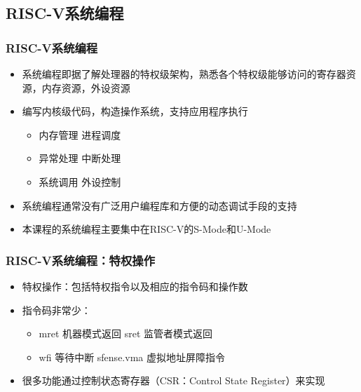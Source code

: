 \subsection{RISC-V系统编程}
\begin{frame}
    \frametitle{RISC-V系统编程}
    \begin{itemize}
        \item 系统编程即据了解处理器的特权级架构，熟悉各个特权级能够访问的寄存器资源，内存资源，外设资源        
        \item 编写内核级代码，构造操作系统，支持应用程序执行
        \begin{itemize}
            \item 内存管理 \quad 进程调度
            \item 异常处理 \quad 中断处理
            \item 系统调用 \quad 外设控制
        \end{itemize}				
        \item 系统编程通常没有广泛用户编程库和方便的动态调试手段的支持
        \item 本课程的系统编程主要集中在RISC-V的S-Mode和U-Mode
    \end{itemize}
    
\end{frame}


\begin{frame}
    \frametitle{RISC-V系统编程：特权操作}
    \begin{itemize}
        \item 特权操作：包括特权指令以及相应的指令码和操作数       
        \item 指令码非常少：
        \begin{itemize}
            \item mret 机器模式返回 \quad sret 监管者模式返回
            \item wfi 等待中断 \quad \quad \quad \quad sfense.vma 虚拟地址屏障指令
        \end{itemize}				
        \item 很多功能通过控制状态寄存器（CSR：Control State Register）来实现
    \end{itemize}
    
\end{frame}

